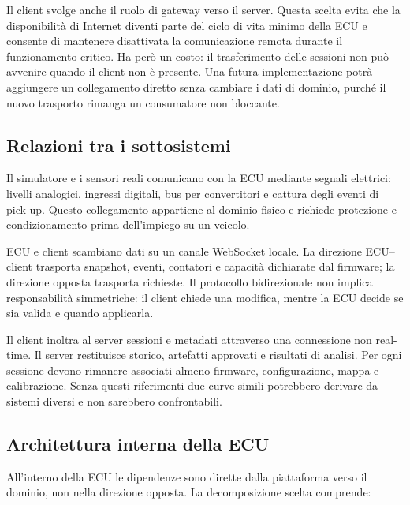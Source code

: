 \documentclass{article}
\begin{document}
Il client svolge anche il ruolo di gateway verso il server. Questa scelta evita
che la disponibilità di Internet diventi parte del ciclo di vita minimo della
ECU e consente di mantenere disattivata la comunicazione remota durante il
funzionamento critico. Ha però un costo: il trasferimento delle sessioni non può
avvenire quando il client non è presente. Una futura implementazione potrà
aggiungere un collegamento diretto senza cambiare i dati di dominio, purché il
nuovo trasporto rimanga un consumatore non bloccante.

\subsection{Relazioni tra i sottosistemi}

Il simulatore e i sensori reali comunicano con la ECU mediante segnali elettrici:
livelli analogici, ingressi digitali, bus per convertitori e cattura degli eventi
di pick-up. Questo collegamento appartiene al dominio fisico e richiede
protezione e condizionamento prima dell'impiego su un veicolo.

ECU e client scambiano dati su un canale WebSocket locale. La direzione ECU--client
trasporta snapshot, eventi, contatori e capacità dichiarate dal firmware; la
direzione opposta trasporta richieste. Il protocollo bidirezionale non implica
responsabilità simmetriche: il client chiede una modifica, mentre la ECU decide
se sia valida e quando applicarla.

Il client inoltra al server sessioni e metadati attraverso una connessione non
real-time. Il server restituisce storico, artefatti approvati e risultati di
analisi. Per ogni sessione devono rimanere associati almeno firmware,
configurazione, mappa e calibrazione. Senza questi riferimenti due curve simili
potrebbero derivare da sistemi diversi e non sarebbero confrontabili.

\subsection{Architettura interna della ECU}

All'interno della ECU le dipendenze sono dirette dalla piattaforma verso il
dominio, non nella direzione opposta. La decomposizione scelta comprende:
\end{document}
